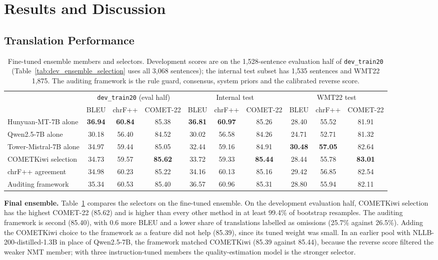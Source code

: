 \documentclass[11pt]{article}
\begin{document}
\section{Results and Discussion}
\label{sec:results}

\subsection{Translation Performance}
\label{subsec:translation_performance}
\begin{table}[t]
\centering
\small
\begin{tabular}{lccccccccc}
\toprule
 & \multicolumn{3}{c}{\texttt{dev\_train20} (eval half)} & \multicolumn{3}{c}{Internal test} & \multicolumn{3}{c}{WMT22 test} \\
 & BLEU & chrF++ & COMET-22 & BLEU & chrF++ & COMET-22 & BLEU & chrF++ & COMET-22 \\
\midrule
Hunyuan-MT-7B alone    & \textbf{36.94} & \textbf{60.84} & 85.38 & \textbf{36.81} & \textbf{60.97} & 85.26 & 28.40 & 55.52 & 81.91 \\
Qwen2.5-7B alone       & 30.18 & 56.40 & 84.52 & 30.02 & 56.58 & 84.26 & 24.71 & 52.71 & 81.32 \\
Tower-Mistral-7B alone & 34.97 & 59.44 & 85.05 & 32.44 & 59.16 & 84.91 & \textbf{30.48} & \textbf{57.05} & 82.64 \\
\midrule
COMETKiwi selection    & 34.73 & 59.57 & \textbf{85.62} & 33.72 & 59.33 & \textbf{85.44} & 28.44 & 55.78 & \textbf{83.01} \\
chrF++ agreement       & 34.98 & 60.23 & 85.22 & 34.16 & 60.13 & 85.16 & 29.42 & 56.85 & 82.54 \\
Auditing framework     & 35.34 & 60.53 & 85.40 & 36.57 & 60.96 & 85.31 & 28.80 & 55.94 & 82.11 \\
\bottomrule
\end{tabular}
\caption{Fine-tuned ensemble members and selectors. Development scores are on the 1,528-sentence evaluation half of \texttt{dev\_train20} (Table~\ref{tab:dev_ensemble_selection} uses all 3,068 sentences); the internal test subset has 1,535 sentences and WMT22 1,875. The auditing framework is the rule guard, consensus, system priors and the calibrated reverse score.}
\label{tab:final_pool}
\end{table}

\textbf{Final ensemble.} Table~\ref{tab:final_pool} compares the selectors on the fine-tuned ensemble. On the development evaluation half, COMETKiwi selection has the highest COMET-22 (85.62) and is higher than every other method in at least 99.4\% of bootstrap resamples. The auditing framework is second (85.40), with 0.6 more BLEU and a lower share of translations labelled as omissions (25.7\% against 26.5\%). Adding the COMETKiwi choice to the framework as a feature did not help (85.39), since its tuned weight was small. In an earlier pool with NLLB-200-distilled-1.3B in place of Qwen2.5-7B, the framework matched COMETKiwi (85.39 against 85.44), because the reverse score filtered the weaker NMT member; with three instruction-tuned members the quality-estimation model is the stronger selector.
\end{document}
